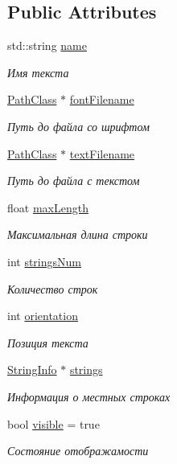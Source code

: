 \subsection*{Public Attributes}
\begin{DoxyCompactItemize}
\item 
std\+::string \hyperlink{struct_interface_element_class_1_1_text_info_aa5b465feb9adce62cc55833e70f89463}{name}
\begin{DoxyCompactList}\small\item\em Имя текста \end{DoxyCompactList}\item 
\hyperlink{class_path_class}{Path\+Class} $\ast$ \hyperlink{struct_interface_element_class_1_1_text_info_ae57fc4845d92e0a33a84681b64c30942}{font\+Filename}
\begin{DoxyCompactList}\small\item\em Путь до файла со шрифтом \end{DoxyCompactList}\item 
\hyperlink{class_path_class}{Path\+Class} $\ast$ \hyperlink{struct_interface_element_class_1_1_text_info_aa9ea7f63235ae0b81f185f5aade92ae4}{text\+Filename}
\begin{DoxyCompactList}\small\item\em Путь до файла с текстом \end{DoxyCompactList}\item 
float \hyperlink{struct_interface_element_class_1_1_text_info_aa162f936178cc35980300a718a511314}{max\+Length}
\begin{DoxyCompactList}\small\item\em Максимальная длина строки \end{DoxyCompactList}\item 
int \hyperlink{struct_interface_element_class_1_1_text_info_a9fdbb361c9f79eb4f54e04faf66d7da5}{strings\+Num}
\begin{DoxyCompactList}\small\item\em Количество строк \end{DoxyCompactList}\item 
int \hyperlink{struct_interface_element_class_1_1_text_info_aacf43b234648dfa207b54b4490fd4b66}{orientation}
\begin{DoxyCompactList}\small\item\em Позиция текста \end{DoxyCompactList}\item 
\hyperlink{struct_interface_element_class_1_1_string_info}{String\+Info} $\ast$ \hyperlink{struct_interface_element_class_1_1_text_info_af673d0e245d0a064bc352c987fda8d9e}{strings}
\begin{DoxyCompactList}\small\item\em Информация о местных строках \end{DoxyCompactList}\item 
bool \hyperlink{struct_interface_element_class_1_1_text_info_a5f29beac69876a5362a2da4941d4983a}{visible} = true
\begin{DoxyCompactList}\small\item\em Состояние отображамости \end{DoxyCompactList}\end{DoxyCompactItemize}


